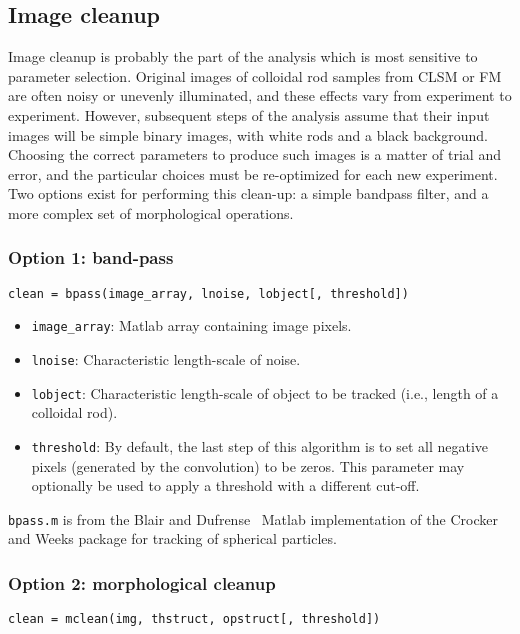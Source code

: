 \subsection{Image cleanup}

Image cleanup is probably the part of the analysis which is most sensitive to parameter selection.
Original images of colloidal rod samples from CLSM or FM are often noisy or unevenly illuminated, and these
effects vary from experiment to experiment.  However, subsequent steps of the analysis assume that their input
images will be simple binary images, with white rods and a black background. Choosing the correct parameters 
to produce such images is a matter of trial and error, and the particular choices must be re-optimized
for each new experiment.  Two options exist for performing this clean-up: a simple bandpass filter, 
and a more complex set of morphological operations.

\subsubsection{Option 1: band-pass}

\texttt{clean = bpass(image\_array, lnoise, lobject[, threshold])}

\begin{itemize}
\item \texttt{image\_array}: Matlab array containing image pixels.
\item \texttt{lnoise}: Characteristic length-scale of noise.
\item \texttt{lobject}: Characteristic length-scale of object to be tracked (i.e., length of a colloidal rod).
\item \texttt{threshold}: By default, the last step of this algorithm is to set all negative pixels (generated
by the convolution) to be zeros. This parameter may optionally be used to apply a threshold with a different cut-off.
\end{itemize}

\texttt{bpass.m} is from the Blair and Dufrense~\cite{blair-matlab} Matlab implementation of the Crocker and Weeks
package for tracking of spherical particles.~\cite{crocker-tracking}

\subsubsection{Option 2: morphological cleanup}

\texttt{clean = mclean(img, thstruct, opstruct[, threshold])}

